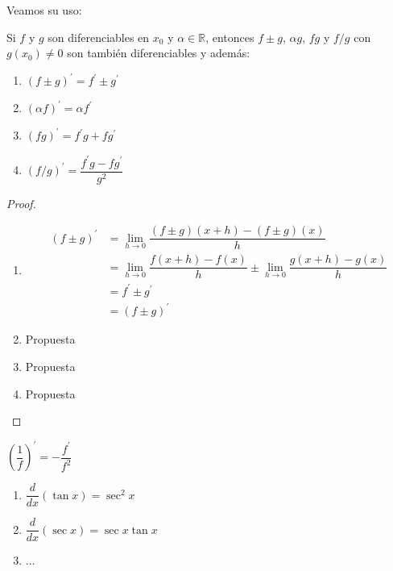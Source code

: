 Veamos su uso:

\begin{thm}
    Si $f$ y $g$ son diferenciables en $x_0$ y $\alpha \in \mathbb{R}$, entonces $f \pm g$, $\alpha g$, $fg$ y $f/g$ con $g(x_0) \neq 0$ son también diferenciables y además:

    \begin{enumerate}
        \item $(f \pm g)^\prime = f^\prime \pm g^\prime$
        \item $(\alpha f)^\prime = \alpha f^\prime$
        \item $(fg)^\prime = f^\prime g + fg^\prime$
        \item $(f/g)^\prime = \dfrac{f^\prime g - fg^\prime}{g^2}$
    \end{enumerate}
\end{thm}

\begin{proof}
    \begin{enumerate}
        \item 
        \begin{align*}
            (f \pm g)^\prime & = \lim_{h \to 0} \dfrac{(f \pm g)(x+h)-(f \pm g)(x)}{h} \\
            & = \lim_{h \to 0} \dfrac{f(x+h)-f(x)}{h} \pm \lim_{h \to 0} \dfrac{g(x+h)-g(x)}{h} \\
            & = f^\prime \pm g^\prime \\
            & = (f \pm g)^\prime 
        \end{align*}
        \item Propuesta
        \item Propuesta
        \item Propuesta
    \end{enumerate}
\end{proof}

\newpage

\begin{cor}
    $\left(\dfrac{1}{f}\right)^\prime = -\dfrac{f^\prime}{f^2}$
\end{cor}

\begin{exs}\leavevmode
    \begin{enumerate}
        \item $\dfrac{d}{dx}(\tan{x}) = \sec^2{x}$
        \item $\dfrac{d}{dx}(\sec{x}) = \sec{x}\tan{x}$
        \item $\dots$
    \end{enumerate}
\end{exs}


